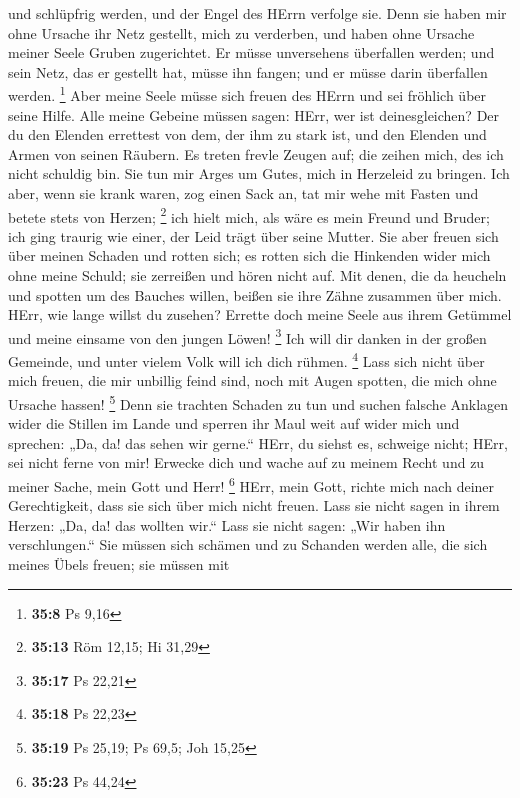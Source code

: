 und schlüpfrig werden, und der Engel des HErrn verfolge sie.
 Denn sie haben mir ohne Ursache ihr Netz gestellt, mich zu
verderben, und haben ohne Ursache meiner Seele Gruben zugerichtet.
 Er müsse unversehens überfallen werden; und sein Netz, das
er gestellt hat, müsse ihn fangen; und er müsse darin überfallen werden.
\footnote{\textbf{35:8} Ps 9,16}  Aber meine Seele müsse
sich freuen des HErrn und sei fröhlich über seine Hilfe. 
Alle meine Gebeine müssen sagen: HErr, wer ist deinesgleichen? Der du
den Elenden errettest von dem, der ihm zu stark ist, und den Elenden und
Armen von seinen Räubern.  Es treten frevle Zeugen auf; die
zeihen mich, des ich nicht schuldig bin.  Sie tun mir Arges
um Gutes, mich in Herzeleid zu bringen.  Ich aber, wenn sie
krank waren, zog einen Sack an, tat mir wehe mit Fasten und betete stets
von Herzen; \footnote{\textbf{35:13} Röm 12,15; Hi 31,29} 
ich hielt mich, als wäre es mein Freund und Bruder; ich ging traurig wie
einer, der Leid trägt über seine Mutter.  Sie aber freuen
sich über meinen Schaden und rotten sich; es rotten sich die Hinkenden
wider mich ohne meine Schuld; sie zerreißen und hören nicht auf.
 Mit denen, die da heucheln und spotten um des Bauches
willen, beißen sie ihre Zähne zusammen über mich.  HErr,
wie lange willst du zusehen? Errette doch meine Seele aus ihrem Getümmel
und meine einsame von den jungen Löwen! \footnote{\textbf{35:17} Ps
  22,21}  Ich will dir danken in der großen Gemeinde, und
unter vielem Volk will ich dich rühmen. \footnote{\textbf{35:18} Ps
  22,23}  Lass sich nicht über mich freuen, die mir
unbillig feind sind, noch mit Augen spotten, die mich ohne Ursache
hassen! \footnote{\textbf{35:19} Ps 25,19; Ps 69,5; Joh 15,25}
 Denn sie trachten Schaden zu tun und suchen falsche
Anklagen wider die Stillen im Lande  und sperren ihr Maul
weit auf wider mich und sprechen: „Da, da! das sehen wir gerne.``
 HErr, du siehst es, schweige nicht; HErr, sei nicht ferne
von mir!  Erwecke dich und wache auf zu meinem Recht und zu
meiner Sache, mein Gott und Herr! \footnote{\textbf{35:23} Ps 44,24}
 HErr, mein Gott, richte mich nach deiner Gerechtigkeit,
dass sie sich über mich nicht freuen.  Lass sie nicht sagen
in ihrem Herzen: „Da, da! das wollten wir.`` Lass sie nicht sagen: „Wir
haben ihn verschlungen.``  Sie müssen sich schämen und zu
Schanden werden alle, die sich meines Übels freuen; sie müssen mit
